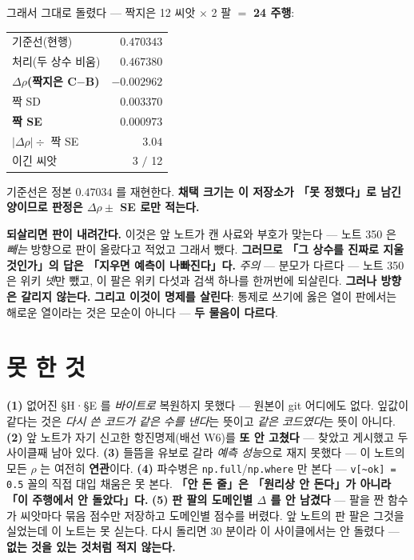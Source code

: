 \documentclass[10pt]{article}
\begin{document}
그래서 그대로 돌렸다 --- 짝지은 12 씨앗 $\times$ 2 팔 $=$ \textbf{24 주행}:

\begin{center}\small
\begin{tabular}{lr}
기준선(현행) & $0.470343$ \\
처리(두 상수 비움) & $0.467380$ \\
\hline
\textbf{$\Delta\rho$(짝지은 C$-$B)} & $\mathbf{-0.002962}$ \\
짝 SD & $0.003370$ \\
\textbf{짝 SE} & $\mathbf{0.000973}$ \\
$|\Delta\rho| \div$ 짝 SE & $3.04$ \\
이긴 씨앗 & 3 $/$ 12 \\
\end{tabular}
\end{center}

\noindent 기준선은 정본 $0.47034$ 를 재현한다. \textbf{채택 크기는 이 저장소가 「못 정했다」로
남긴 양이므로 판정은 $\Delta\rho \pm$ SE 로만 적는다.}

\textbf{되살리면 판이 내려간다.} 이것은 앞 노트가 캔 사료와 부호가 맞는다 --- 노트 350 은 \emph{빼는} 방향으로 판이 올랐다고 적었고 그래서 뺐다. \textbf{그러므로 「그 상수를 진짜로 지울 것인가」의 답은 「지우면 예측이 나빠진다」다.} \emph{주의} --- 분모가 다르다 --- 노트 350 은 위키 \emph{넷}만 뺐고, 이 팔은 위키 다섯과 검색 하나를 한꺼번에 되살린다. \textbf{그러나 방향은 갈리지 않는다.} \textbf{그리고 이것이 명제를 살린다}: 통제로 쓰기에 옳은 열이 판에서는 해로운 열이라는 것은 모순이 아니다 --- \textbf{두 물음이 다르다}.

\section{못 한 것}

\textbf{(1)} 없어진 §H·§E 를 \emph{바이트로} 복원하지 못했다 --- 원본이 git 어디에도 없다.
잎값이 같다는 것은 \emph{다시 쓴 코드가 같은 수를 낸다}는 뜻이고 \emph{같은 코드였다}는 뜻이
아니다. \textbf{(2)} 앞 노트가 자기 신고한 항진명제(배선 W6)를 \textbf{또 안 고쳤다} ---
찾았고 게시했고 두 사이클째 남아 있다. \textbf{(3)} 들뜸을 유보로 갈라 \emph{예측 성능}으로
재지 못했다 --- 이 노트의 모든 $\rho$ 는 여전히 \textbf{연관}이다. \textbf{(4)} 파수병은
\texttt{np.full}/\texttt{np.where} 만 본다 --- \texttt{v[\textasciitilde ok] = 0.5} 꼴의
직접 대입 채움은 못 본다. \textbf{「안 돈 줄」은 「원리상 안 돈다」가 아니라 「이 주행에서 안
돌았다」다.} \textbf{(5)} \textbf{판 팔의 도메인별 $\Delta$ 를 안 남겼다} --- 팔을 짠
함수가 씨앗마다 묶음 점수만 저장하고 도메인별 점수를 버렸다. 앞 노트의 판 팔은 그것을
실었는데 이 노트는 못 싣는다. 다시 돌리면 30 분이라 이 사이클에서는 안 돌렸다 ---
\textbf{없는 것을 있는 것처럼 적지 않는다.}
\end{document}

